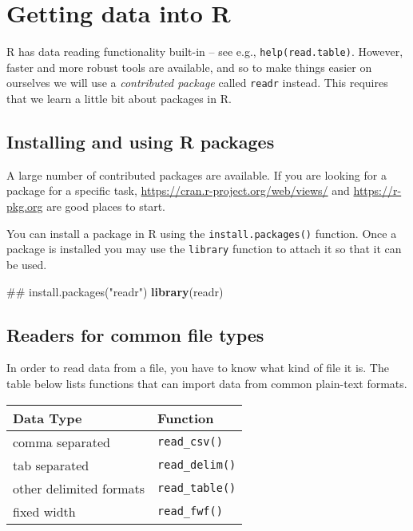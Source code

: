 \documentclass[]{book}
\newenvironment{Shaded}{\begin{snugshade}}{\end{snugshade}}
\newcommand{\KeywordTok}[1]{\textcolor[rgb]{0.13,0.29,0.53}{\textbf{#1}}}
\newcommand{\NormalTok}[1]{#1}
\begin{document}
\chapter{Getting data into R}\label{getting-data-into-r}

R has data reading functionality built-in -- see e.g.,
\texttt{help(read.table)}. However, faster and more robust tools are
available, and so to make things easier on ourselves we will use a
\emph{contributed package} called \texttt{readr} instead. This requires
that we learn a little bit about packages in R.

\section{Installing and using R
packages}\label{installing-and-using-r-packages}

A large number of contributed packages are available. If you are looking
for a package for a specific task,
\url{https://cran.r-project.org/web/views/} and \url{https://r-pkg.org}
are good places to start.

You can install a package in R using the \texttt{install.packages()}
function. Once a package is installed you may use the \texttt{library}
function to attach it so that it can be used.

\begin{Shaded}
\begin{Highlighting}[]
\NormalTok{## install.packages("readr")}
\KeywordTok{library}\NormalTok{(readr)}
\end{Highlighting}
\end{Shaded}

\section{Readers for common file
types}\label{readers-for-common-file-types}

In order to read data from a file, you have to know what kind of file it
is. The table below lists functions that can import data from common
plain-text formats.

\begin{longtable}[]{@{}ll@{}}
\toprule
Data Type & Function\tabularnewline
\midrule
\endhead
comma separated & \texttt{read\_csv()}\tabularnewline
tab separated & \texttt{read\_delim()}\tabularnewline
other delimited formats & \texttt{read\_table()}\tabularnewline
fixed width & \texttt{read\_fwf()}\tabularnewline
\bottomrule
\end{longtable}
\end{document}
